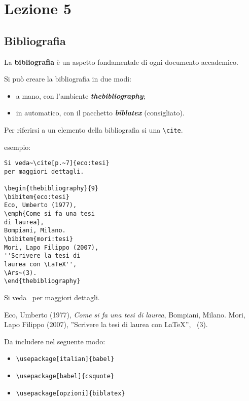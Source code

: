 \documentclass{article}
\begin{document}
    \chapter{Lezione 5}
        \section{Bibliografia}
            La \textbf{bibliografia} è un aspetto fondamentale di ogni documento
            accademico.
            
            Si può creare la bibliografia in due modi:
            \begin{itemize}
                \item a mano, con l'ambiente \emph{\textbf{thebibliography}};
                \item in automatico, con il pacchetto \emph{\textbf{biblatex}} (consigliato).
            \end{itemize}
            
            Per riferirsi a un elemento della bibliografia si una \verb!\cite!.
            
            esempio:

\begin{minipage}{\linewidth}
\begin{multicols}{2}
\begin{lstlisting}[frame=single]
Si veda~\cite[p.~7]{eco:tesi}
per maggiori dettagli.

\begin{thebibliography}{9}
\bibitem{eco:tesi}
Eco, Umberto (1977),
\emph{Come si fa una tesi
di laurea},
Bompiani, Milano.
\bibitem{mori:tesi}
Mori, Lapo Filippo (2007),
''Scrivere la tesi di 
laurea con \LaTeX'',
\Ars~(3).
\end{thebibliography}
\end{lstlisting}
%
\columnbreak{}
%
Si veda~\cite[p.~7]{eco:tesi}
per maggiori dettagli.

\begin{thebibliography}{9}
Eco, Umberto (1977),
\emph{Come si fa una tesi
di laurea},
Bompiani, Milano.
Mori, Lapo Filippo (2007),
''Scrivere la tesi di 
laurea con \LaTeX'',
\Ars~(3).
\end{thebibliography}
\end{multicols}
\end{minipage}


            Da includere nel seguente modo:
            \begin{itemize}
                \item \verb!\usepackage[italian]{babel}!
                \item \verb!\usepackage[babel]{csquote}!
                \item \verb!\usepackage[opzioni]{biblatex}!
            \end{itemize}
\end{document}
